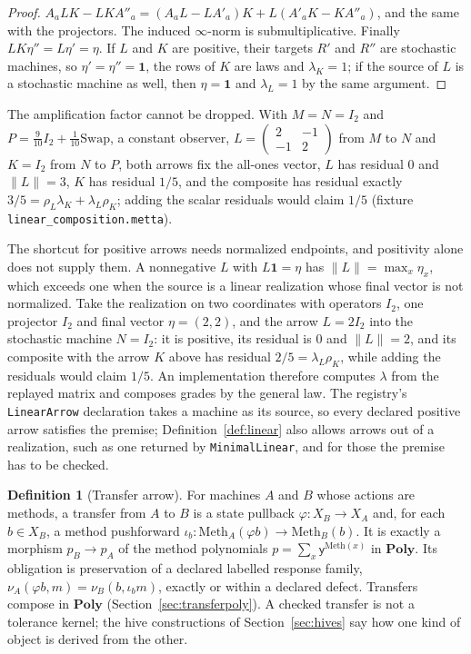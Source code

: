 \documentclass[11pt]{article}
\newcommand{\code}[1]{\texttt{#1}}
\newcommand{\Poly}{\mathbf{Poly}}
\theoremstyle{definition}
\newtheorem{definition}{Definition}[section]
\theoremstyle{plain}
\begin{document}
\begin{proof}
$A_aLK-LKA''_a=(A_aL-LA'_a)K+L(A'_aK-KA''_a)$, and the same with the projectors. The induced
$\infty$-norm is submultiplicative. Finally $LK\eta''=L\eta'=\eta$. If $L$ and $K$ are positive,
their targets $R'$ and $R''$ are stochastic machines, so $\eta'=\eta''=\mathbf 1$, the rows of $K$ are
laws and $\lambda_K=1$; if the source of $L$ is a stochastic machine as well, then $\eta=\mathbf 1$
and $\lambda_L=1$ by the same argument.
\end{proof}

The amplification factor cannot be dropped. With $M=N=I_2$ and $P=\tfrac{9}{10}I_2+
\tfrac1{10}\mathrm{Swap}$, a constant observer, $L=\left(\begin{smallmatrix}2&-1\\-1&2
\end{smallmatrix}\right)$ from $M$ to $N$ and $K=I_2$ from $N$ to $P$, both arrows fix the all-ones
vector, $L$ has residual $0$ and $\|L\|=3$, $K$ has residual $1/5$, and the composite has residual
exactly $3/5=\rho_L\lambda_K+\lambda_L\rho_K$; adding the scalar residuals would claim $1/5$
(fixture \code{linear\_composition.metta}).

The shortcut for positive arrows needs normalized endpoints, and positivity alone does not supply
them. A nonnegative $L$ with $L\mathbf 1=\eta$ has $\|L\|=\max_x\eta_x$, which exceeds one when the
source is a linear realization whose final vector is not normalized. Take the realization on two
coordinates with operators $I_2$, one projector $I_2$ and final vector $\eta=(2,2)$, and the arrow
$L=2I_2$ into the stochastic machine $N=I_2$: it is positive, its residual is $0$ and $\|L\|=2$, and
its composite with the arrow $K$ above has residual $2/5=\lambda_L\rho_K$, while adding the residuals
would claim $1/5$. An implementation therefore computes $\lambda$ from the replayed matrix and
composes grades by the general law. The registry's \code{LinearArrow} declaration takes a machine as
its source, so every declared positive arrow satisfies the premise; Definition~\ref{def:linear} also
allows arrows out of a realization, such as one returned by \code{MinimalLinear}, and for those the
premise has to be checked.

\begin{definition}[Transfer arrow]\label{def:transfer}
For machines $A$ and $B$ whose actions are methods, a transfer from $A$ to $B$ is a state
pullback $\varphi:X_B\to X_A$ and, for each $b\in X_B$, a method pushforward
$\iota_b:\mathrm{Meth}_A(\varphi b)\to\mathrm{Meth}_B(b)$. It is exactly a morphism
$p_B\to p_A$ of the method polynomials $p=\sum_x\mathsf y^{\mathrm{Meth}(x)}$ in $\Poly$. Its
obligation is preservation of a declared labelled response family,
$\nu_A(\varphi b,m)=\nu_B(b,\iota_b m)$, exactly or within a declared defect. Transfers compose
in $\Poly$ (Section~\ref{sec:transferpoly}). A checked transfer is not a tolerance kernel; the
hive constructions of Section~\ref{sec:hives} say how one kind of object is derived from the
other.
\end{definition}
\end{document}

